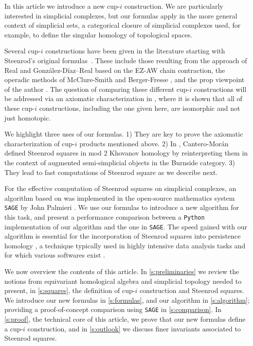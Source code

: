 In this article we introduce a new cup-$i$ construction.
We are particularly interested in simplicial complexes, but our formulas apply in the more general context of simplicial sets, a categorical closure of simplicial complexes used, for example, to define the singular homology of topological spaces.

Several cup-$i$ constructions have been given in the literature starting with Steenrod's original formulas~\cite{steenrod47}.
These include those resulting from the approach of Real \cite{real1996computability} and Gonz\'alez-D\'iaz--Real \cite{gonzalez1999combinatorial, gonzalez2003computation, gonzalez2005hpt} based on the EZ-AW chain contraction, the operadic methods of McClure-Smith \cite{mcclure03cochain} and Berger-Fresse \cite{berger04combinatorial}, and the prop viewpoint of the author \cite{medina2020prop1, medina2018prop2}.
The question of comparing these different cup-$i$ constructions will be addressed via an axiomatic characterization in \cite{medina2018axiomatic}, where it is shown that all of these cup-$i$ constructions, including the one given here, are isomorphic and not just homotopic.

We highlight three uses of our formulas.
1) They are key to prove the axiomatic characterization of cup-$i$ products mentioned above.
2) In \cite{cantero2020khovanov}, Cantero-Mor\'an defined Steenrod squares in mod 2 Khovanov homology \cite{khovanov2000categorification} by reinterpreting them in the context of augmented semi-simplicial objects in the Burnside category.
3) They lead to fast computations of Steenrod square as we describe next.

For the effective computation of Steenrod squares on simplicial complexes, an algorithm based on \cite{gonzalez1999combinatorial} was implemented in the open-source mathematics system \verb|SAGE| by John Palmieri \cite{sagemath}.
We use our formulas to introduce a new algorithm for this task, and present a performance comparison between a \verb|Python| implementation of our algorithm and the one in \verb|SAGE|.
The speed gained with our algorithm is essential for the incorporation of Steenrod squares into persistence homology \cite{medina2018persistence}, a technique typically used in highly intensive data analysis tasks \cite{carlsson2008images, carlsson2013viral, lee2018nanoporous} and for which various softwares exist \cite{bauer2019ripser, gudhi, medina2020giottotda}.

We now overview the contents of this article.
In \cref{s:preliminaries} we review the notions from equivariant homological algebra and simplicial topology needed to present, in \cref{s:squares}, the definition of cup-$i$ construction and Steenrod squares.
We introduce our new formulas in \cref{s:formulas}, and our algorithm in \cref{s:algorithm}; providing a proof-of-concept comparison using \verb|SAGE| in \cref{s:comparison}.
In \cref{s:proof}, the technical core of this article, we prove that our new formulas define a cup-$i$ construction, and in \cref{s:outlook} we discuss finer invariants associated to Steenrod squares.
